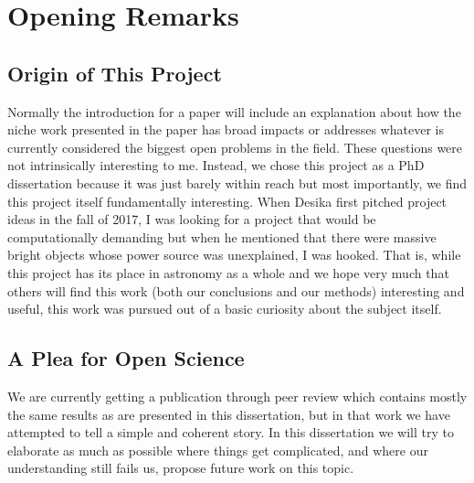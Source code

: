 \section{Opening Remarks}

\subsection{Origin of This Project}
Normally the introduction for a paper will include an explanation about how the niche work presented in the paper has broad impacts or addresses whatever is currently considered the biggest open problems in the field.
These questions were not intrinsically interesting to me.
Instead, we chose this project as a PhD dissertation because it was just barely within reach but most importantly, we find this project itself fundamentally interesting.
When Desika first pitched project ideas in the fall of 2017, I was looking for a project that would be computationally demanding but when he mentioned that there were massive bright objects whose power source was unexplained, I was hooked.
That is, while this project has its place in astronomy as a whole and we hope very much that others will find this work (both our conclusions and our methods) interesting and useful, this work was pursued out of a basic curiosity about the subject itself.


\subsection{A Plea for Open Science}
We are currently getting a publication through peer review which contains mostly the same results as are presented in this dissertation, but in that work we have attempted to tell a simple and coherent story.
In this dissertation we will try to elaborate as much as possible where things get complicated, and where our understanding still fails us, propose future work on this topic.


